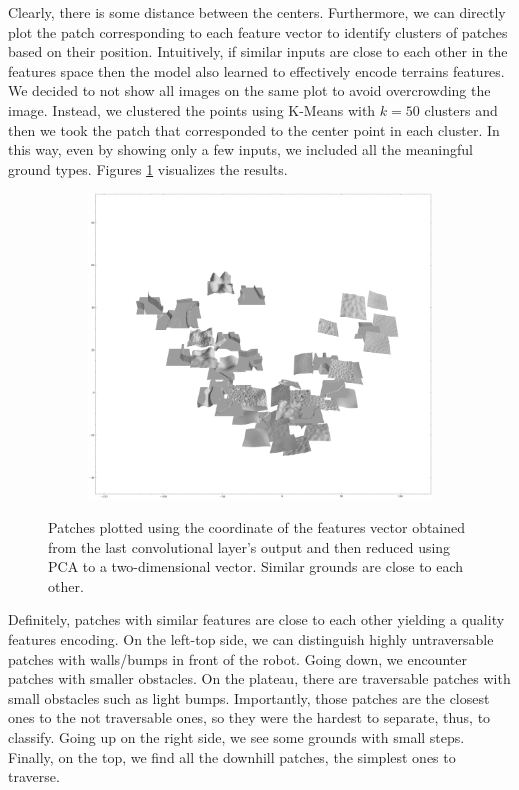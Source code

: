 \documentclass[../document.tex]{subfiles}
\begin{document}
Clearly, there is some distance between the centers. Furthermore, we can directly plot the patch corresponding to each feature vector to identify clusters of patches based on their position. Intuitively, if similar inputs are close to each other in the features space then the model also learned to effectively encode terrains features. We decided to not show all images on the same plot to avoid overcrowding the image. Instead, we clustered the points using K-Means with $k=50$ clusters and then we took the patch that corresponded to the center point in each cluster. In this way, even by showing only a few inputs, we included all the meaningful ground types. Figures \ref{fig : pca-patches-200} visualizes the results.
\begin{figure} [htbp]
    \centering
    \begin{subfigure}[b]{1\textwidth}
        \includegraphics[width=\linewidth]{../img/5/pca/pca-patches-50-None.png}
    \end{subfigure}
    \caption{Patches plotted using the coordinate of the features vector obtained from the last convolutional layer's output and then reduced using PCA to a two-dimensional vector. Similar grounds are close to each other.}
    \label{fig : pca-patches-200}
\end{figure}
Definitely, patches with similar features are close to each other yielding a quality features encoding. On the left-top side, we can distinguish highly untraversable patches with walls/bumps in front of the robot. Going down, we encounter patches with smaller obstacles. On the plateau, there are traversable patches with small obstacles such as light bumps. Importantly,  those patches are the closest ones to the not traversable ones, so they were the hardest to separate, thus, to classify.  Going up on the right side, we see some grounds with small steps. Finally, on the top, we find all the downhill patches, the simplest ones to traverse.
\end{document}

